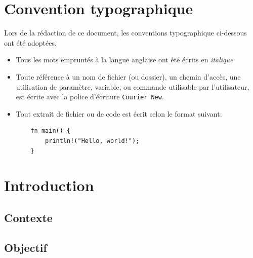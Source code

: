 \documentclass[a4paper]{article}
\begin{document}
\section*{Convention typographique}
Lors de la rédaction de ce document, les conventions typographique ci-dessous ont
été adoptées.
\begin{itemize}[label=\textbullet]
	\item Tous les mots empruntés à la langue anglaise ont été écrits en \textit{italique}
	\item Toute référence à un nom de fichier (ou dossier), un chemin d’accès, une 
    utilisation de paramètre, variable, ou commande utilisable par l’utilisateur, 
    est écrite avec la police d’écriture \texttt{Courier New}.
	\item Tout extrait de fichier ou de code est écrit selon le format suivant:
    \begin{verbatim}
    fn main() {
        println!("Hello, world!");
    }
    \end{verbatim}
\end{itemize}
\newpage

\printglossary[type=\acronymtype,title={Acronymes}]
\newpage


\section{Introduction}
\subsection{Contexte}


\subsection{Objectif}
\end{document}
